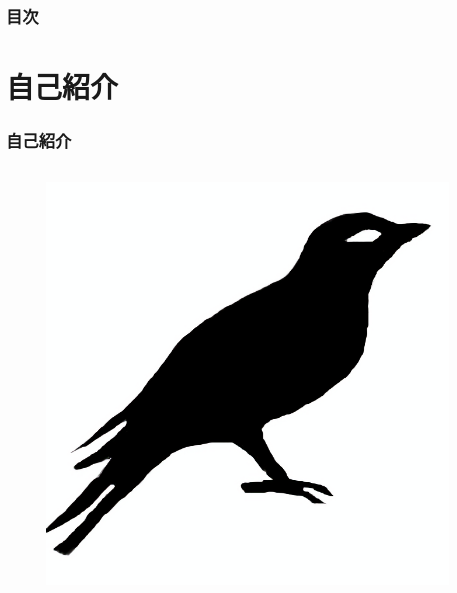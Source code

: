 \frame{\maketitle}

\begin{frame}
  \frametitle{目次}

  \tableofcontents
\end{frame}

\section{自己紹介}
\begin{frame}
  \frametitle{自己紹介}
  
  \begin{columns}
    \begin{column}{0.3\textwidth}
      \begin{center}
        \begin{figure}[h]
          \includegraphics[width=0.95\textwidth]{img/bird2x.png}%
        \end{figure}
      \end{center}
 

\end{column}
\end{columns}
\end{frame}
